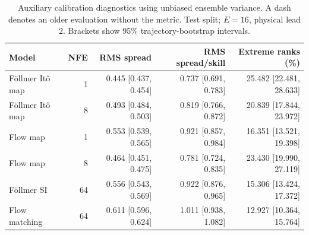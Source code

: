 \begin{table}[t]
\centering
\small
\setlength{\tabcolsep}{3pt}
\caption{Auxiliary calibration diagnostics using unbiased ensemble variance. A dash denotes an older evaluation without the metric. Test split; $E=16$, physical lead 2. Brackets show 95\% trajectory-bootstrap intervals.}
\label{tab:map-rms-calibration}
\begin{tabular}{lrrrr}
\toprule
Model & NFE & RMS spread & RMS spread/skill & Extreme ranks (\%) \\
\midrule
Föllmer Itô map & 1 & 0.445 [0.437, 0.454] & 0.737 [0.691, 0.783] & 25.482 [22.481, 28.633] \\
Föllmer Itô map & 8 & 0.493 [0.484, 0.503] & 0.819 [0.766, 0.872] & 20.839 [17.844, 23.972] \\
\addlinespace
Flow map & 1 & 0.553 [0.539, 0.565] & 0.921 [0.857, 0.984] & 16.351 [13.521, 19.398] \\
Flow map & 8 & 0.464 [0.451, 0.475] & 0.781 [0.724, 0.835] & 23.430 [19.990, 27.119] \\
\addlinespace
Föllmer SI & 64 & 0.556 [0.543, 0.569] & 0.922 [0.876, 0.965] & 15.306 [13.424, 17.372] \\
\addlinespace
Flow matching & 64 & 0.611 [0.596, 0.624] & 1.011 [0.938, 1.082] & 12.927 [10.364, 15.764] \\
\bottomrule
\end{tabular}
\end{table}
